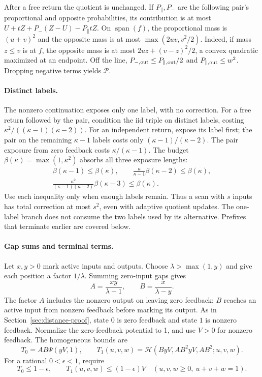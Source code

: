 After a free return the quotient is unchanged. If $P_\parallel,P_-$ are
the following pair's proportional and opposite probabilities, its
contribution is at most $U+tZ+P_-(Z-U)-P_\parallel tZ$. On $\operatorname{span}(f)$, the proportional
mass is $(u+v)^2$ and the opposite mass is at most $\max(2uv,v^2/2)$.
Indeed, if mass $z\le v$ is at $f$, the opposite mass is at most
$2uz+(v-z)^2/2$, a convex quadratic maximized at an endpoint. Off the
line, $P_{-,\rm out}\le P_{\parallel,\rm out}/2$ and $P_{\parallel,\rm out}\le w^2$.
Dropping negative terms yields $\mathcal P$.

\paragraph{Distinct labels.}
The nonzero continuation exposes only one label, with no correction.
For a free return followed by the pair, condition the iid triple on
distinct labels, costing $\kappa^2/((\kappa-1)(\kappa-2))$. For an independent return,
expose its label first; the pair on the remaining $\kappa-1$ labels costs only
$(\kappa-1)/(\kappa-2)$. The pair exposure from zero feedback costs $\kappa/(\kappa-1)$.
The budget $\beta(\kappa)=\max(1,\kappa^2)$ absorbs all three exposure lengths:
\[
 \begin{gathered}
 \beta(\kappa-1)\le\beta(\kappa),\qquad
 \frac \kappa{\kappa-1}\beta(\kappa-2)\le\beta(\kappa),\\
 \frac{\kappa^2}{(\kappa-1)(\kappa-2)}\beta(\kappa-3)\le\beta(\kappa).
 \end{gathered}
\]
Use each inequality only when enough labels remain. Thus a scan with
$s$ inputs has total correction at most $s^2$, even with adaptive quotient
updates. The one-label branch does not consume the two labels used by
its alternative. Prefixes that terminate earlier are covered below.

\paragraph{Gap sums and terminal terms.}
Let $x,y>0$ mark active inputs and outputs. Choose
$\lambda>\max(1,y)$ and give each position a factor $1/\lambda$.
Summing zero-input gaps gives
\[
 A=\frac{xy}{\lambda-1},\qquad B=\frac{x}{\lambda-y}.
\]
The factor $A$ includes the nonzero output on leaving zero feedback;
$B$ reaches an active input from nonzero feedback before marking its
output. As in Section~\ref{sec:distance-proof}, state $0$ is zero
feedback and state $1$ is nonzero feedback. Normalize the zero-feedback
potential to 1, and use $V>0$ for nonzero feedback. The homogeneous
bounds are
\[
 T_0=AB\Psi(yV,1),\qquad
 T_1(u,v,w)=\mathcal H(ByV,AB^2yV,AB^2;u,v,w).
\]
For a rational $0<\epsilon<1$, require
\begin{equation}\label{eq:renewal-witness}
 T_0\le1-\epsilon,\qquad
 T_1(u,v,w)\le(1-\epsilon)V
 \quad(u,v,w\ge0,\ u+v+w=1).
\end{equation}

